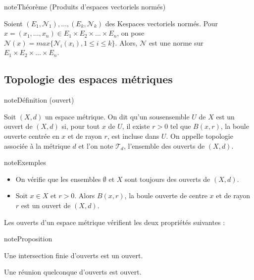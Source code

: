\documentclass[letterpaper,10pt,french]{sphinxmanual}
\begin{document}
\begin{sphinxadmonition}{note}{Théorème (Produits d’espaces vectoriels normés)}

\sphinxAtStartPar
Soient \((E_1, \mathcal N_1),\ldots, (E_k,\mathcal N_k)\) des K\sphinxhyphen{}espaces vectoriels normés.
Pour \(x = (x_1,\ldots, x_n) \in E_1\times E_2 \times \ldots \times E_n\), on pose \(\mathcal N(x) = max \{\mathcal N_i(x_i), 1 \leq i \leq k\}\). Alors, \(\mathcal N\) est une norme sur \(E_1\times E_2 \times \ldots \times E_n\).
\end{sphinxadmonition}


\subsection{Topologie des espaces métriques}
\label{\detokenize{mnspace:topologie-des-espaces-metriques}}
\begin{sphinxadmonition}{note}{Définition (ouvert)}

\sphinxAtStartPar
Soit \((X, d)\) un espace métrique. On dit qu’un sous\sphinxhyphen{}ensemble \(U\) de \(X\) est un ouvert de  \((X, d)\) si, pour tout \(x\) de \(U\), il existe \(r > 0\) tel que \(B(x,r)\), la boule ouverte centrée en \(x\) et de rayon \(r\), est incluse dans \(U\). On appelle topologie associée à la métrique \(d\) et l’on note \(\mathcal T_d\), l’ensemble des ouverts de \((X, d)\).
\end{sphinxadmonition}

\begin{sphinxadmonition}{note}{Exemples}
\begin{itemize}
\item {} 
\sphinxAtStartPar
On vérifie que les ensembles \(\emptyset\) et \(X\) sont toujours des ouverts de \((X, d)\).

\item {} 
\sphinxAtStartPar
Soit \(x \in X\) et \(r>0\). Alors \(B(x,r)\), la boule ouverte de centre \(x\) et de rayon \(r\) est un ouvert de \((X, d)\).

\end{itemize}
\end{sphinxadmonition}

\sphinxAtStartPar
Les ouverts d’un espace métrique vérifient les deux propriétés suivantes :

\begin{sphinxadmonition}{note}{Proposition}

\sphinxhyphen{} Une intersection finie d’ouverts est un ouvert.

\sphinxhyphen{} Une réunion quelconque d’ouverts est ouvert.
\end{sphinxadmonition}
\end{document}
